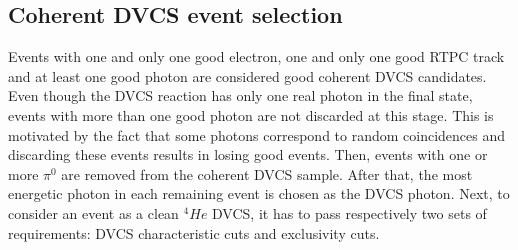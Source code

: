 \subsection{Coherent DVCS event selection}
Events with one and only one good electron, one and only one good RTPC 
track and at least one good photon are considered good coherent DVCS 
candidates. Even though the DVCS reaction has only one real photon in the final 
state, events with more than one good photon are not discarded at this stage.  
This is motivated by the fact that some photons correspond to random 
coincidences and discarding these events results in losing good events. Then, 
events with one or more $\pi^{0}$ are removed from the coherent DVCS sample.  
After that, the most energetic photon in each remaining event is chosen as the 
DVCS photon. Next, to consider an event as a clean $^{4}He$ DVCS, it has to 
pass respectively two sets of requirements: DVCS characteristic cuts and 
exclusivity cuts.

~\newpage

